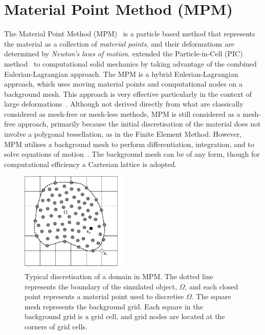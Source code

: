 \section{Material Point Method (MPM)}
The Material Point Method (MPM)~\citep{Sulsky1994,Sulsky1995} is a particle 
based method that represents the material as a collection of \textit{material 
points}, and their deformations are determined by \textit{Newton's laws of 
motion}. \citet{Sulsky1994} extended the Particle-in-Cell (PIC) 
method~\citep{Harlow1964} to computational solid mechanics by taking advantage 
of the combined Eulerian-Lagrangian approach. The MPM is a 
hybrid Eulerian-Lagrangian approach, which uses moving material points and 
computational nodes on a background mesh. This approach is very effective 
particularly in the context of large 
deformations~\citep{Mackenzie-Helnwein2010,Shin2010a,Mast2014,Andersen2010,Zhang2009,Bandara2013}.
Although not derived directly from what are classically considered as mesh-free 
or mesh-less methods, MPM is still considered as a mesh-free approach, 
primarily because the initial discretisation of the material does not involve a 
polygonal tessellation, as in the Finite Element Method. However, MPM utilises 
a background mesh to perform differentiation, integration, and to solve 
equations of motion~\citep{Steffen2008}. The background mesh can be of any 
form, though for computational efficiency a Cartesian lattice is adopted.

\begin{figure}[tbhp]
\centering
\includegraphics[width=0.45\textwidth]{MPM}
\caption[Typical discretisation of a domain in MPM.]{Typical discretisation of a 
domain in MPM. The dotted line represents the boundary of the simulated object, 
$\Omega$, and each closed point represents a material point used to discretise 
$\Omega$. The square mesh represents the background grid. Each square in the 
background grid is a grid cell, and grid nodes are located at the corners of 
grid cells.}
\label{fig:MPM}
\end{figure}

